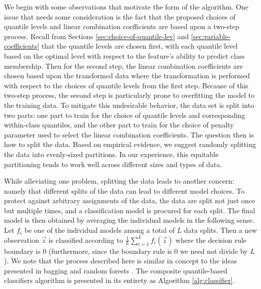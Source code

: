 We begin with some observations that motivate the form of the algorithm.  One
issue that needs some consideration is the fact that the proposed choices of
quantile levels and linear combination coefficients are based upon a two-step
process.  Recall from Sections \ref{sec:choice-of-quantile-lev} and
\ref{sec:variable-coefficients} that the quantile levels are chosen first, with
each quantile level based on the optimal level with respect to the feature's
ability to predict class membership.  Then for the second step, the linear
combination coefficients are chosen based upon the transformed data where the
transformation is performed with respect to the choices of quantile levels from
the first step.  Because of this two-step process, the second step is
particularly prone to overfitting the model to the training data.  To mitigate
this undesirable behavior, the data set is split into two parts: one part to
train for the choice of quantile levels and corresponding within-class
quantiles, and the other part to train for the choice of penalty parameter used
to select the linear combination coefficients.  The question then is how to
split the data.  Based on empirical evidence, we suggest randomly splitting the
data into evenly-sized partitions.  In our experience, this equitable
partitioning tends to work well across different sizes and types of data.

While alleviating one problem, splitting the data leads to another concern:
namely that different splits of the data can lead to different model choices.
To protect against arbitrary assignments of the data, the data are split not
just once but multiple times, and a classification model is procured for each
split.  The final model is then obtained by averaging the individual models in
the following sense.  Let $f_i$ be one of the individual models among a total of
$L$ data splits.  Then a new observation $\vec{z}$ is classified according to
$\frac{1}{L} \sum_{i=1}^L f_i(\vec{z})$ where the decision rule boundary is 0
(furthermore, since the boundary rule is 0 we need not divide by $L$).  We note
that the process described here is similar in concept to the ideas presented in
bagging \cite{breiman1996} and random forests \cite{breiman2001}.  The composite
quantile-based classifiers algorithm is presented in its entirety as Algorithm
\ref{alg:classifier}.


